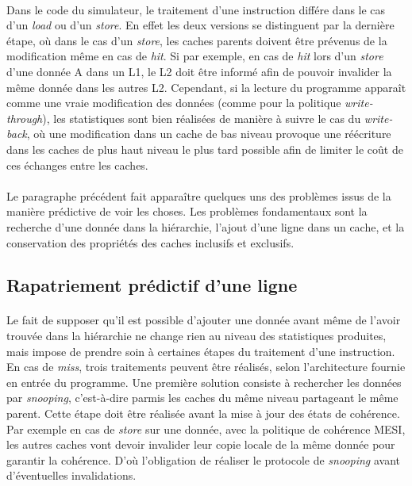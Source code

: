 \paragraph{}
Dans le code du simulateur, le traitement d'une instruction différe dans le cas d'un \emph{load} ou d'un \emph{store}. En effet les deux versions se distinguent par la dernière étape, où dans le cas d'un \emph{store}, les caches parents doivent être prévenus de la modification même en cas de \emph{hit}. Si par exemple, en cas de \emph{hit} lors d'un \emph{store} d'une donnée A dans un L1, le L2 doit être informé afin de pouvoir invalider la même donnée dans les autres L2. Cependant, si la lecture du programme apparaît comme une vraie modification des données (comme pour la politique \emph{write-through}), les statistiques sont bien réalisées de manière à suivre le cas du \emph{write-back}, où une modification dans un cache de bas niveau provoque une réécriture dans les caches de plus haut niveau le plus tard possible afin de limiter le coût de ces échanges entre les caches.

\paragraph{}
Le paragraphe précédent fait apparaître quelques uns des problèmes issus de la manière prédictive de voir les choses. Les problèmes fondamentaux sont la recherche d'une donnée dans la hiérarchie, l'ajout d'une ligne dans un cache, et la conservation des propriétés des caches inclusifs et exclusifs.

\subsection{Rapatriement prédictif d'une ligne}

\paragraph{}
Le fait de supposer qu'il est possible d'ajouter une donnée avant même de l'avoir trouvée dans la hiérarchie ne change rien au niveau des statistiques produites, mais impose de prendre soin à certaines étapes du traitement d'une instruction. En cas de \emph{miss}, trois traitements peuvent être réalisés, selon l'architecture fournie en entrée du programme. Une première solution consiste à rechercher les données par \emph{snooping}, c'est-à-dire parmis les caches du même niveau partageant le même parent. Cette étape doit être réalisée avant la mise à jour des états de cohérence. Par exemple en cas de \emph{store} sur une donnée, avec la politique de cohérence MESI, les autres caches vont devoir invalider leur copie locale de la même donnée pour garantir la cohérence. D'où l'obligation de réaliser le protocole de \emph{snooping} avant d'éventuelles invalidations.

